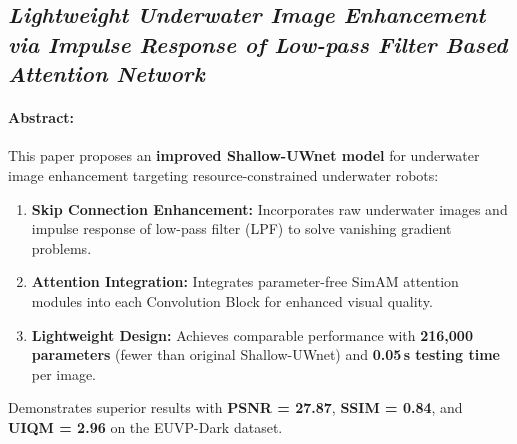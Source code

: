 \subsection{\textit{Lightweight Underwater Image Enhancement via Impulse Response of Low-pass Filter Based Attention Network}}

\paragraph{Abstract:}
This paper proposes an \textbf{improved Shallow-UWnet model} for underwater image enhancement targeting resource-constrained underwater robots:
\begin{enumerate}
    \item \textbf{Skip Connection Enhancement:} Incorporates raw underwater images and impulse response of low-pass filter (LPF) to solve vanishing gradient problems.
    \item \textbf{Attention Integration:} Integrates parameter-free SimAM attention modules into each Convolution Block for enhanced visual quality.
    \item \textbf{Lightweight Design:} Achieves comparable performance with \textbf{216,000 parameters} (fewer than original Shallow-UWnet) and \textbf{0.05\,s testing time} per image.
\end{enumerate}
Demonstrates superior results with \textbf{PSNR = 27.87}, \textbf{SSIM = 0.84}, and \textbf{UIQM = 2.96} on the EUVP-Dark dataset.

